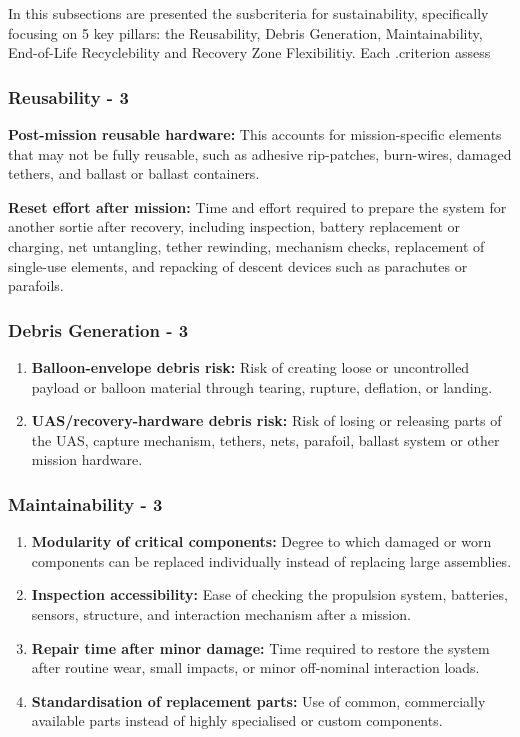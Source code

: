 In this subsections are presented the susbcriteria for sustainability, specifically focusing on 5 key pillars: the Reusability, Debris Generation, Maintainability, End-of-Life Recyclebility and Recovery Zone  Flexibilitiy. Each .criterion assess 
\subsubsection*{Reusability - 3}  
 
\item \textbf{Post-mission reusable hardware:}  This accounts for mission-specific elements that may not be fully reusable, such as adhesive rip-patches, burn-wires, damaged tethers, and ballast or ballast containers.

\item \textbf{Reset effort after mission:} Time and effort required to prepare the system for another sortie after recovery, including inspection, battery replacement or charging, net untangling, tether rewinding, mechanism checks, replacement of single-use elements, and repacking of descent devices such as parachutes or parafoils. 

\subsubsection*{Debris Generation - 3}
\begin{enumerate}
        \item \textbf{Balloon-envelope debris risk:} Risk of creating loose or uncontrolled payload or balloon material through tearing, rupture, deflation, or landing.

        \item \textbf{UAS/recovery-hardware debris risk:} Risk of losing or releasing parts of the UAS, capture mechanism, tethers, nets, parafoil, ballast system or other mission hardware.
\end{enumerate}

\subsubsection*{Maintainability - 3}
\begin{enumerate}
    \item \textbf{Modularity of critical components:} Degree to which damaged or worn components can be replaced individually instead of replacing large assemblies.
    \item \textbf{Inspection accessibility:} Ease of checking the propulsion system, batteries, sensors, structure, and interaction mechanism after a mission.
    \item \textbf{Repair time after minor damage:} Time required to restore the system after routine wear, small impacts, or minor off-nominal interaction loads.
    \item \textbf{Standardisation of replacement parts:} Use of common, commercially available parts instead of highly specialised or custom components.
\end{enumerate}

